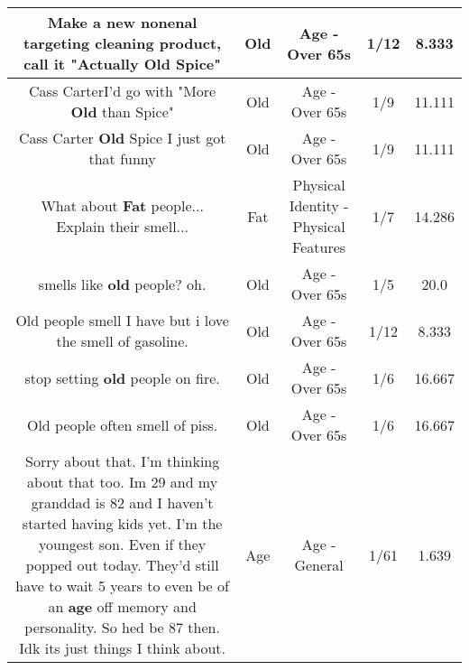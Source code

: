 \documentclass[11pt]{article}
\newlength\mylength
\begin{document}
\begin{center}
\begin{longtable}{|C{.65\mylength}|C{.30\mylength}|C{.12\mylength}|C{.12\mylength}|C{.12\mylength}|}
  \small Make a new nonenal targeting cleaning product, call it "Actually \textbf{Old} Spice"\normalsize   & Old & Age - Over 65s & 1/12 & 8.333 \\  \hline
  \small Cass CarterI'd go with "More \textbf{Old} than Spice"\normalsize   & Old & Age - Over 65s & 1/9 & 11.111 \\  \hline
  \small Cass Carter \textbf{Old} Spice I just got that funny\normalsize   & Old & Age - Over 65s & 1/9 & 11.111 \\  \hline
  \small What about \textbf{Fat} people... Explain their smell...\normalsize   & Fat & Physical Identity - Physical Features & 1/7 & 14.286 \\  \hline
  \small smells like \textbf{old} people? oh.\normalsize   & Old & Age - Over 65s & 1/5 & 20.0 \\  \hline
  \small Old people smell I have but i love the smell of gasoline.\normalsize   & Old & Age - Over 65s & 1/12 & 8.333 \\  \hline
  \small stop setting \textbf{old} people on fire.\normalsize   & Old & Age - Over 65s & 1/6 & 16.667 \\  \hline
  \small Old people often smell of piss.\normalsize   & Old & Age - Over 65s & 1/6 & 16.667 \\  \hline
  \small Sorry about that. I'm thinking about that too. Im 29 and my granddad is 82 and I haven't started having kids yet. I'm  the youngest son. Even if they popped out today. They'd still have to wait 5 years to even be of an \textbf{age} off memory and personality. So hed be 87 then. Idk its just things I  think about.\normalsize   & Age & Age - General & 1/61 & 1.639 \\  \hline

\end{longtable}
\end{center}
\end{document}
